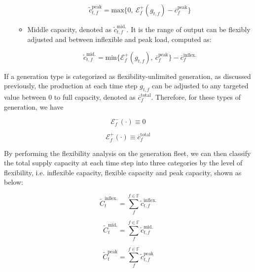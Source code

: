 \begin{enumerate}
\begin{itemize}
		\begin{equation*}
		\tilde{c}_{t,f}^{\text{peak}} = \text{max}\{0,~\mathcal{E}_f^+(g_{t,f}) -\overline{c}_f^{\text{peak}}\}
		\end{equation*}
		
		\item Middle capacity, denoted as $\tilde{c}_{t,f}^{\text{mid.}}$. It is the range of output can be flexibly adjusted and between inflexible and peak load, computed as:
		
		\begin{equation*}
		\tilde{c}_{t,f}^{\text{mid.}} = \text{min} \{\mathcal{E}_f^+(g_{t,f}),~\overline{c}_f^{\text{peak}}\} - \overline{c}_f^{\text{inflex.}}
		\end{equation*}
		
	\end{itemize}
\end{enumerate}


If a generation type is categorized as flexibility-unlimited generation, as discussed previously, the production at each time step $g_{t,f}$ can be adjusted to any targeted value between 0 to full capacity, denoted as $\overline{c}_f^{\text{total}}$. Therefore, for these types of generation, we have 

\begin{equation*}
\mathcal{E}_f^-(\cdot) \equiv 0
\end{equation*}

\begin{equation*}
\mathcal{E}_f^+(\cdot) \equiv \overline{c}_f^{\text{total}}
\end{equation*}

By performing the flexibility analysis on the generation fleet, we can then classify the total supply capacity at each time step into three categories by the level of flexibility, i.e. inflexible capacity, flexible capacity and peak capacity, shown as below:

\begin{equation}
\label{eq:inflex_total}
\tilde{C}_{t}^{\text{inflex.}} = \sum_{f}^{f \in \mathbb{F}} \tilde{c}_{t,f}^{\text{inflex.}}
\end{equation}

\begin{equation}
\tilde{C}_{t}^{\text{mid.}} = \sum_{f}^{f \in \mathbb{F}} \tilde{c}_{t,f}^{\text{mid.}}
\end{equation}

\begin{equation}
\label{eq:peak_total}
\tilde{C}_{t}^{\text{peak}} = \sum_{f}^{f \in \mathbb{F}} \tilde{c}_{t,f}^{\text{peak}}
\end{equation}

